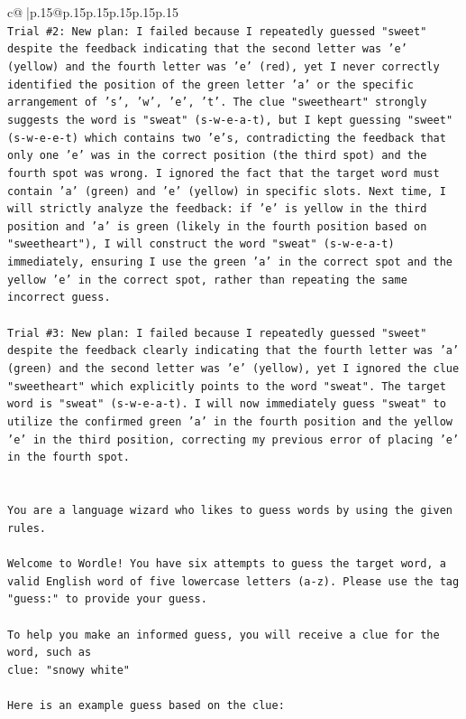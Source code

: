 \documentclass{article}
\begin{document}
{\begin{supertabular}{c@{$\;$}|p{.15\linewidth}@{}p{.15\linewidth}p{.15\linewidth}p{.15\linewidth}p{.15\linewidth}p{.15\linewidth}}
{{{\\ 
\texttt{Trial \#2: New plan: I failed because I repeatedly guessed "sweet" despite the feedback indicating that the second letter was 'e' (yellow) and the fourth letter was 'e' (red), yet I never correctly identified the position of the green letter 'a' or the specific arrangement of 's', 'w', 'e', 't'. The clue "sweetheart" strongly suggests the word is "sweat" (s{-}w{-}e{-}a{-}t), but I kept guessing "sweet" (s{-}w{-}e{-}e{-}t) which contains two 'e's, contradicting the feedback that only one 'e' was in the correct position (the third spot) and the fourth spot was wrong. I ignored the fact that the target word must contain 'a' (green) and 'e' (yellow) in specific slots. Next time, I will strictly analyze the feedback: if 'e' is yellow in the third position and 'a' is green (likely in the fourth position based on "sweetheart"), I will construct the word "sweat" (s{-}w{-}e{-}a{-}t) immediately, ensuring I use the green 'a' in the correct spot and the yellow 'e' in the correct spot, rather than repeating the same incorrect guess.} \\
\\ 
\texttt{Trial \#3: New plan: I failed because I repeatedly guessed "sweet" despite the feedback clearly indicating that the fourth letter was 'a' (green) and the second letter was 'e' (yellow), yet I ignored the clue "sweetheart" which explicitly points to the word "sweat". The target word is "sweat" (s{-}w{-}e{-}a{-}t). I will now immediately guess "sweat" to utilize the confirmed green 'a' in the fourth position and the yellow 'e' in the third position, correcting my previous error of placing 'e' in the fourth spot.} \\
\\ 
\\ 
\texttt{You are a language wizard who likes to guess words by using the given rules.} \\
\\ 
\texttt{Welcome to Wordle! You have six attempts to guess the target word, a valid English word of five lowercase letters (a{-}z). Please use the tag "guess:" to provide your guess.} \\
\\ 
\texttt{To help you make an informed guess, you will receive a clue for the word, such as} \\
\texttt{clue: "snowy white"} \\
\\ 
\texttt{Here is an example guess based on the clue: } \\
}}}
\end{supertabular}}
\end{document}
